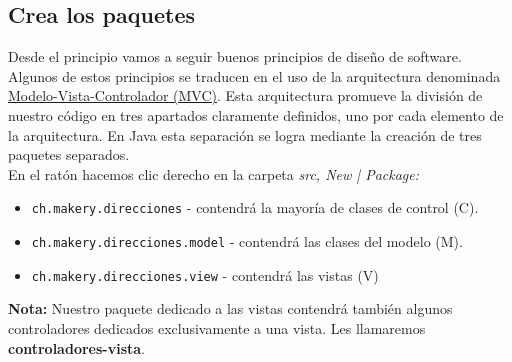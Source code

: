 \subsection{Crea los paquetes}
Desde el principio vamos a seguir buenos principios de diseño de software. Algunos de estos principios se traducen en el uso de la arquitectura denominada \textcolor{azul}{\href{https://es.wikipedia.org/wiki/Modelo\%E2\%80\%93vista\%E2\%80\%93controlador}{Modelo-Vista-Controlador (MVC)}}. Esta arquitectura promueve la división de nuestro código en tres apartados claramente definidos, uno por cada elemento de la arquitectura. En Java esta separación se logra mediante la creación de tres paquetes separados.\\
En el ratón hacemos clic derecho en la carpeta \textit{src, New | Package:}
\begin{itemize}
	\item \textcolor{codigo}{\texttt{ch.makery.direcciones}} - contendrá la mayoría de clases de control (C).
	\item \textcolor{codigo}{\texttt{ch.makery.direcciones.model}} - contendrá las clases del modelo (M).
	\item \textcolor{codigo}{\texttt{ch.makery.direcciones.view}} - contendrá las vistas (V)
\end{itemize}
\textbf{Nota:} Nuestro paquete dedicado a las vistas contendrá también algunos controladores dedicados exclusivamente a una vista. Les llamaremos \textbf{controladores-vista}.

